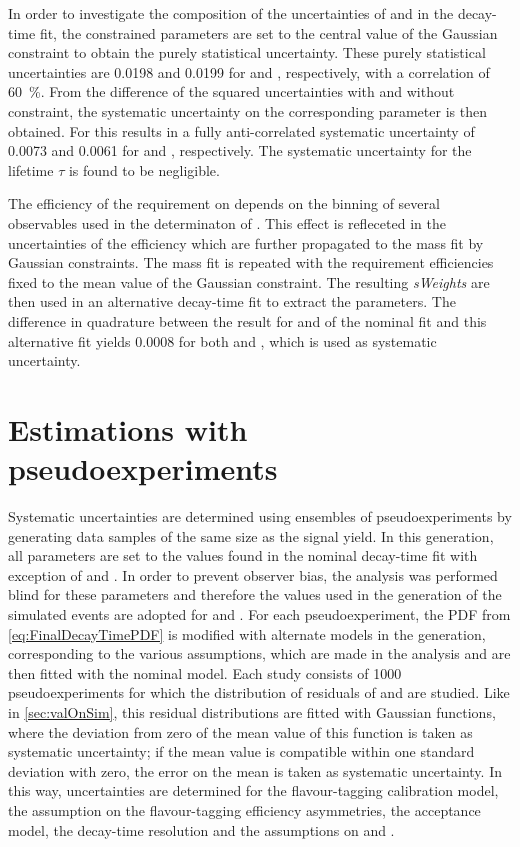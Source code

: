 In order to investigate the composition of the uncertainties of \Sf and \Sfbar in the decay-time fit, the constrained parameters are set to the central value of the Gaussian constraint to obtain the purely statistical uncertainty.
These purely statistical uncertainties are \num{0.0198} and \num{0.0199} for \Sf and \Sfbar, respectively, with a correlation of \SI{60}{\percent}.
From the difference of the squared uncertainties with and without constraint, the systematic uncertainty on the corresponding parameter is then obtained.
For \dm this results in a fully anti-correlated systematic uncertainty of \num{0.0073} and \num{0.0061} for \Sf and \Sfbar, respectively.
The systematic uncertainty for the \Bz lifetime $\tau$ is found to be negligible.

The efficiency of the requirement on \dllkpi depends on the binning of several observables used in the determinaton of \dllkpi.
This effect is refleceted in the uncertainties of the efficiency which are further propagated to the mass fit by Gaussian constraints.
The mass fit is repeated with the \dllkpi requirement efficiencies fixed to the mean value of the Gaussian constraint.
The resulting \emph{sWeights} are then used in an alternative decay-time fit to extract the \CP parameters.
The difference in quadrature between the result for \Sf and \Sfbar of the nominal fit and this alternative fit yields \num{0.0008} for both \Sf and \Sfbar, which is used as systematic uncertainty.

\section{Estimations with pseudoexperiments}
\label{sec:systUncertsPseudo}

Systematic uncertainties are determined using ensembles of pseudoexperiments by generating data samples of the same size as the \BdToDpi signal yield.
In this generation, all parameters are set to the values found in the nominal decay-time fit with exception of \Sf and \Sfbar.
In order to prevent observer bias, the analysis was performed blind for these parameters and therefore the values used in the generation of the simulated events are adopted for \Sf and \Sfbar.
For each pseudoexperiment, the PDF from \cref{eq:FinalDecayTimePDF} is modified with alternate models in the generation, corresponding to the various assumptions, which are made in the analysis and are then fitted with the nominal model.
Each study consists of \num{1000} pseudoexperiments for which the distribution of residuals of \Sf and \Sfbar are studied.
Like in \cref{sec:valOnSim}, this residual distributions are fitted with Gaussian functions, where the deviation from zero of the mean value of this function is taken as systematic uncertainty; if the mean value is compatible within one standard deviation with zero, the error on the mean is taken as systematic uncertainty.
In this way, uncertainties are determined for the flavour-tagging calibration model, the assumption on the flavour-tagging efficiency asymmetries, the acceptance model, the decay-time resolution and the assumptions on \DG and \Cf.

